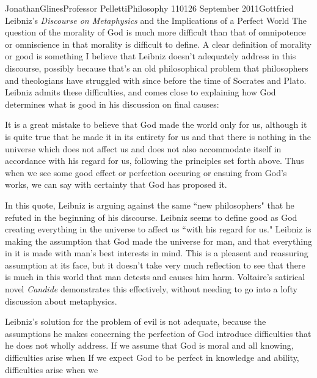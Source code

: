 \documentclass[12pt,letterpaper]{article}
\begin{document}
\begin{mla}{Jonathan}{Glines}{Professor Pelletti}{Philosophy 1101}{26 September 2011}{Gottfried Leibniz's \textit{Discourse on Metaphysics} and the Implications of a Perfect World}
The question of the morality of God is much more difficult than that of omnipotence or omniscience in that morality is difficult to define. A clear definition of morality or good is something I believe that Leibniz doesn't adequately address in this discourse, possibly because that's an old philosophical problem that philosophers and theologians have struggled with since before the time of Socrates and Plato. Leibniz admits these difficulties, and comes close to explaining how God determines what is good in his discussion on final causes:
\begin{mlaquote}
It is a great mistake to believe that God made the world only for us, although it is quite true that he made it in its entirety for us and that there is nothing in the universe which does not affect us and does not also accommodate itself in accordance with his regard for us, following the principles set forth above. Thus when we see some good effect or perfection occuring or ensuing from God's works, we can say with certainty that God has proposed it.
\end{mlaquote}
In this quote, Leibniz is arguing against the same ``new philosophers" that he refuted in the beginning of his discourse. Leibniz seems to define good as God creating everything in the universe to affect us ``with his regard for us." Leibniz is making the assumption that God made the universe for man, and that everything in it is made with man's best interests in mind. This is a pleasent and reassuring assumption at its face, but it doesn't take very much reflection to see that there is much in this world that man detests and causes him harm. Voltaire's satirical novel \textit{Candide} demonstrates this effectively, without needing to go into a lofty discussion about metaphysics.

Leibniz's solution for the problem of evil is not adequate, because the assumptions he makes concerning the perfection of God introduce difficulties that he does not wholly address. If we assume that God is moral and all knowing, difficulties arise when  If we expect God to be perfect in knowledge and ability, difficulties arise when we 


%
%
%
\end{mla}
\end{document}
